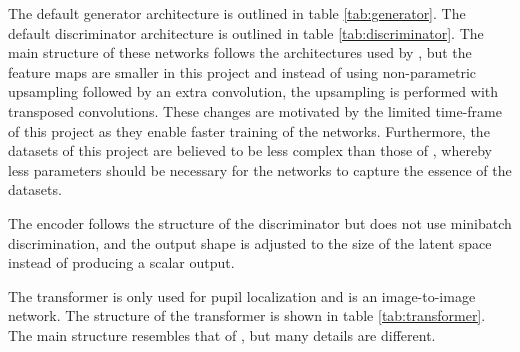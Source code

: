 The default generator architecture is outlined in table \ref{tab:generator}. The default discriminator architecture is outlined in table \ref{tab:discriminator}. The main structure of these networks follows the architectures used by \textcite{karras2017progressive}, but the feature maps are smaller in this project and instead of using non-parametric upsampling followed by an extra convolution, the upsampling is performed with transposed convolutions. These changes are motivated by the limited time-frame of this project as they enable faster training of the networks. Furthermore, the datasets of this project are believed to be less complex than those of \textcite{karras2017progressive}, whereby less parameters should be necessary for the networks to capture the essence of the datasets.

The encoder follows the structure of the discriminator but does not use minibatch discrimination, and the output shape is adjusted to the size of the latent space instead of producing a scalar output. 

The transformer is only used for pupil localization and is an image-to-image network. The structure of the transformer is shown in table \ref{tab:transformer}. The main structure resembles that of \textcite{ronneberger2015u}, but many details are different. 


